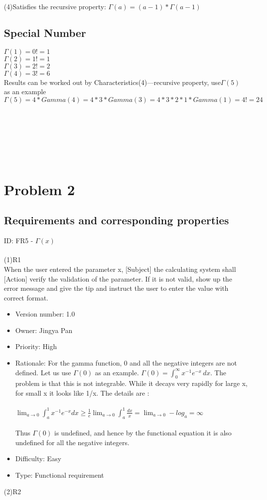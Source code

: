 \documentclass[a4paper, 11pt]{article}
\begin{document}
\indent(4)Satisfies the recursive property: $\Gamma(a)=(a-1)*\Gamma(a-1)$

\subsection{Special Number}
\indent\indent $\Gamma(1) = 0! = 1$\\
\indent $\Gamma(2) = 1! = 1$ \\
\indent $\Gamma(3) = 2! = 2$ \\
\indent $\Gamma(4) = 3! = 6$ \\
\indent Results can be worked out by Characteristics(4)---recursive property, use$\Gamma(5)$ as an example \\
\indent $\Gamma(5)=4*Gamma(4)=4*3*Gamma(3)=4*3*2*1*Gamma(1)=4!=24$\\\\\\\\\\\\\


\section{Problem 2}
\subsection{Requirements and corresponding properties}
\indent ID:  FR5 - $\Gamma \left( x \right)$ \\ \\
(1)R1 \\
\indent When the user entered the parameter x, [Subject] the calculating system shall [Action] verify the validation of the parameter. If it is not valid, show up the error message and give the tip and instruct the user to enter the value with correct format. 

\begin{itemize}
    \item Version number: 1.0
    \item Owner: Jingya Pan
    \item Priority: High
    \item Rationale: For the gamma function, 0 and all the negative integers are not defined. Let us use $\Gamma \left( 0 \right)$ as an example. ${\displaystyle \Gamma (0)=\int _{0}^{\infty }x^{-1}e^{-x}\,dx}$. The problem is that this is not integrable. While it decays very rapidly for large x, for small x it looks like 1/x. The details are : \\\\
     $\lim_{a \to 0}\int _{a}^{1}x^{-1}e^{-x}dx \geq \frac{1}{e}\lim_{a \to 0}\int _{a}^{1} \frac{dx}{x}=\lim_{a \to 0}-log_a=\infty$ \\\\
    Thus $\Gamma \left( 0 \right)$ is undefined, and hence by the functional equation it is also undefined for all the negative integers.
    \item Difficulty: Easy
    \item Type: Functional requirement
\end{itemize}
(2)R2
\end{document}
